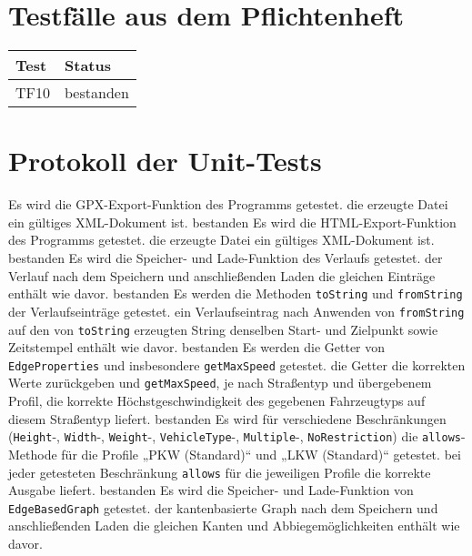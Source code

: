 \documentclass[a4paper, 11pt]{article}
\newcommand{\code}[1]{\texttt{#1}}
\begin{document}
\section{Testfälle aus dem Pflichtenheft}
\begin{tabular}{|l|l|}
	\hline
	Test & Status \\
	\hline
	\hline
	TF10 & bestanden \\
	\hline
\end{tabular}

\section{Protokoll der Unit-Tests}
\begin{itemize}
     {Es wird die GPX-Export-Funktion des Programms getestet.}
     {die erzeugte Datei ein gültiges XML-Dokument ist.}
     {bestanden}
     {Es wird die HTML-Export-Funktion des Programms getestet.}
     {die erzeugte Datei ein gültiges XML-Dokument ist.}
     {bestanden}
     {Es wird die Speicher- und Lade-Funktion des Verlaufs getestet.}
     {der Verlauf nach dem Speichern und anschließenden Laden die gleichen Einträge enthält wie davor.}
     {bestanden}
     {Es werden die Methoden \code{toString} und \code{fromString} der Verlaufseinträge getestet.}
     {ein Verlaufseintrag nach Anwenden von \code{fromString} auf den von \code{toString} erzeugten String denselben Start- und Zielpunkt sowie Zeitstempel enthält wie davor.}
     {bestanden}
     {Es werden die Getter von \code{EdgeProperties} und insbesondere \code{getMaxSpeed} getestet.}
     {die Getter die korrekten Werte zurückgeben und \code{getMaxSpeed}, je nach Straßentyp und übergebenem Profil, die korrekte Höchstgeschwindigkeit des gegebenen Fahrzeugtyps auf diesem Straßentyp liefert.}
     {bestanden}
     {Es wird für verschiedene Beschränkungen (\mbox{\code{Height}-,} \mbox{\code{Width}-,} \mbox{\code{Weight}-,} \mbox{\code{VehicleType}-,} \mbox{\code{Multiple}-,} \code{NoRestriction}) die \code{allows}-Methode für die Profile „PKW (Standard)“ und „LKW (Standard)“ getestet.}
     {bei jeder getesteten Beschränkung \code{allows} für die jeweiligen Profile die korrekte Ausgabe liefert.}
     {bestanden}
     {Es wird die Speicher- und Lade-Funktion von \code{EdgeBasedGraph} getestet.}
     {der kantenbasierte Graph nach dem Speichern und anschließenden Laden die gleichen Kanten und Abbiegemöglichkeiten enthält wie davor.}

\end{itemize}
\end{document}
